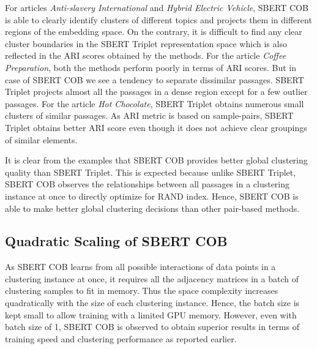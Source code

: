 \documentclass[11pt,a4paper]{article}
\begin{document}
For articles \textit{Anti-slavery International} and \textit{Hybrid Electric Vehicle}, SBERT COB is able to clearly identify clusters of different topics and projects them in different regions of the embedding space. On the contrary, it is difficult to find any clear cluster boundaries in the SBERT Triplet representation space which is also reflected in the ARI scores obtained by the methods. For the article \textit{Coffee Preparation}, both the methods perform poorly in terms of ARI scores. But in case of SBERT COB we see a tendency to separate dissimilar passages. SBERT Triplet projects almost all the passages in a dense region except for a few outlier passages. For the article \textit{Hot Chocolate}, SBERT Triplet obtains numerous small clusters of similar passages. As ARI metric is based on sample-pairs, SBERT Triplet obtains better ARI score even though it does not achieve clear groupings of similar elements.

It is clear from the examples that SBERT COB provides better global clustering quality than SBERT Triplet. This is expected because unlike SBERT Triplet, SBERT COB observes the relationships between all passages in a clustering instance at once to directly optimize for RAND index. Hence, SBERT COB is able to make better global clustering decisions than other pair-based methods. %

\subsection{Quadratic Scaling of SBERT COB} As SBERT COB learns from all possible interactions of data points in a clustering instance at once, it requires all the adjacency matrices in a batch of clustering samples to fit in memory. Thus the space complexity increases quadratically with the size of each clustering instance. Hence, the batch size is kept small to allow training with a limited GPU memory. However, even with batch size of 1, SBERT COB is observed to obtain superior results in terms of training speed and clustering performance as reported earlier.
\end{document}
